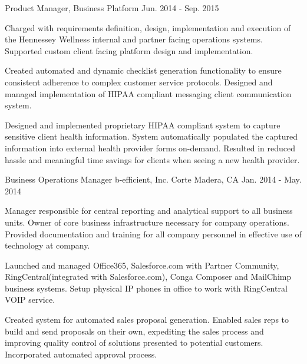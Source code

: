 \begin{cventries}
\cventry
{Product Manager, Business Platform} %
{} %
{} %
{Jun. 2014 - Sep. 2015} %
{ %
\begin{cvitems}
\item {Charged with requirements definition, design, implementation and execution of the Hennessey Wellness internal and partner facing operations systems. Supported custom client facing platform design and implementation.}
\item {Created automated and dynamic checklist generation functionality to ensure consistent adherence to complex customer service protocols. Designed and managed implementation of HIPAA compliant messaging client communication system.}
\item {Designed and implemented proprietary HIPAA compliant system to capture sensitive client health information. System automatically populated the captured information into external health provider forms on-demand. Resulted in reduced hassle and meaningful time savings for clients when seeing a new health provider.}
\end{cvitems}
}


\cventry
{Business Operations Manager} %
{b-efficient, Inc.} %
{Corte Madera, CA} %
{Jan. 2014 - May. 2014} %
{ %
\begin{cvitems}
\item {Manager responsible for central reporting and analytical support to all business units. Owner of core business infrastructure necessary for company operations. Provided documentation and training for all company personnel in effective use of technology at company.}
\item {Launched and managed Office365, Salesforce.com with Partner Community, RingCentral(integrated with Salesforce.com), Conga Composer and MailChimp business systems. Setup physical IP phones in office to work with RingCentral VOIP service.}
\item {Created system for automated sales proposal generation. Enabled sales reps to build and send proposals on their own, expediting the sales process and improving quality control of solutions presented to potential customers. Incorporated automated approval process.}
\end{cvitems} 
}



\end{cventries}
